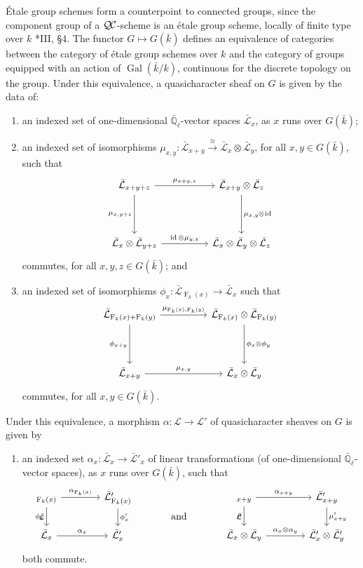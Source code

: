 \documentclass[11pt]{amsart}
\makeatletter
\theoremstyle{plain}
\theoremstyle{definition}
\theoremstyle{remark}
\newcommand{\EE}{\mathbb{\bar Q}_\ell}
\newcommand{\bFq}{\bar{k}}
\newcommand{\Fq}{k}
\DeclareMathOperator{\Gal}{Gal}
\newcommand{\Frob}[1]{\operatorname{F}_{#1}}
\DeclareMathOperator{\id}{id}
\newcommand{\iso}{{\ \cong\ }}
\newcommand{\qcs}[1]{{\mathcal{#1}}}
\newcommand{\gqcs}[1]{{\mathcal{\bar #1}}}
\newcommand{\QC}{{\mathcal{Q\hskip-0.8pt C}}}
\newcommand{\labitem}[2]{%
\def\@itemlabel{\textbf{#1}}
\item
\def\@currentlabel{#1}\label{#2}}
\newcommand{\tight}[3]{\hspace{-#1pt}{#2}\hspace{-#3pt}}
\makeatother
\begin{document}
\'Etale group schemes form a counterpoint to connected groups,
since the component group of a $\QC$-scheme
is an \'etale group scheme, locally of finite type over $\Fq$
\cite{vdGeer-Moonen:AbelianVarieties}*{III, \S 4}.
The functor $G \mapsto G(\bFq)$ defines an equivalence of categories
between the category of \'etale group schemes over $\Fq$ and the category of groups equipped
with an action of $\Gal(\bFq/\Fq)$, continuous for the discrete topology on the group.
Under this equivalence, a quasicharacter sheaf on $G$ is given by the data of:
\begin{enumerate}
 \labitem{(cs.0)}{cs.0} an indexed set of one-dimensional
  $\EE$-vector spaces $\gqcs{L}_x$, as $x$ runs over
  $G(\bFq)$;

 \labitem{(cs.1)}{cs.1} an indexed set of isomorphisms
  $\mu_{x,y} : \gqcs{L}_{x+y} \xrightarrow{\iso} \gqcs{L}_{x} \otimes\gqcs{L}_{y}$,
  for all $x,y \in G(\bFq)$, such that
  \[
   \begin{tikzcd}[row sep=40]
    \gqcs{L}_{x+y+z} \arrow{rr}{\mu_{x+y,z}} \arrow[swap]{d}{\mu_{x,y+z}}
    && \gqcs{L}_{x+y}\otimes\gqcs{L}_{z} \dar{\mu_{x,y} \tight{0.5}{\otimes}{1} \id} \\
    \gqcs{L}_{x} \otimes\gqcs{L}_{y+z} \arrow{rr}{\id \otimes\mu_{y,z}}
    && \gqcs{L}_{x} \otimes\gqcs{L}_{y} \otimes\gqcs{L}_{z}
   \end{tikzcd}
  \]
  commutes, for all $x,y,z\in G(\bFq)$; and

 \labitem{(cs.2)}{cs.2} an indexed set of isomorphisms $\phi_{x} : \gqcs{L}_{\Frob{\Fq}(x)} \to \gqcs{L}_x$
  such that
  \[
   \begin{tikzcd}[row sep=40]
    \gqcs{L}_{\Frob{\Fq}(x)+\Frob{\Fq}(y)} \arrow[swap]{d}{\phi_{x+y}} \arrow{rr}{\mu_{\Frob{\Fq}(x),\Frob{\Fq}(y)}}
    && \gqcs{L}_{\Frob{\Fq}(x)}\otimes\gqcs{L}_{\Frob{\Fq}(y)} \dar{\phi_x \tight{0}{\otimes}{0} \phi_y} \\
    \gqcs{L}_{x+y} \arrow{rr}{\mu_{x,y}}
    && \gqcs{L}_x \otimes\gqcs{L}_y
   \end{tikzcd}
  \]
  commutes, for all $x,y\in G(\bFq)$.
\end{enumerate}
Under this equivalence, a morphism $\alpha : \qcs{L} \to \qcs{L'}$ of quasicharacter sheaves on $G$ is given by 
\begin{enumerate}
 \labitem{(cs.3)}{cs.3} an indexed set $\alpha_x : \gqcs{L}_x \to \gqcs{L'}_x$
  of linear transformations (of one-dimensional $\EE$-vector spaces),
  as $x$ runs over $G(\bFq)$, such that
  \[
   \begin{tikzcd}[column sep=40]
    \arrow[swap]{d}{\phi_x} \gqcs{L}_{\Frob{\Fq}(x)} \rar{\alpha_{\Frob{\Fq}(x)}} & \gqcs{L'}_{\Frob{\Fq}(x)} \dar{\phi_x'}
    &\arrow[draw=none]{d}[pos=.4,description]{\text{\normalsize{and}}}
    & \arrow[swap]{d}{\mu} \gqcs{L}_{x+y} \rar{\alpha_{x+y}} & \gqcs{L'}_{x+y} \dar{\mu'_{x+y}} \\
    \gqcs{L}_x \rar{\alpha_x} & \gqcs{L'}_x
    & {} & \gqcs{L}_x\otimes\gqcs{L}_y \rar{\alpha_x\otimes\alpha_y} & \gqcs{L'}_x \otimes\gqcs{L'}_y
   \end{tikzcd}
  \]
  both commute.
\end{enumerate}
\end{document}
